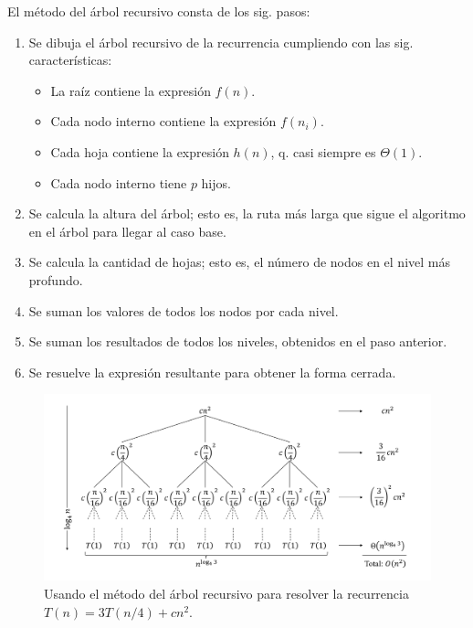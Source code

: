 El método del árbol recursivo consta de los sig. pasos:


\begin{enumerate}
  \item Se dibuja el árbol recursivo de la recurrencia cumpliendo con las sig. características:
  \begin{itemize}
    \item La raíz contiene la expresión \(f(n)\).
    \item Cada nodo interno contiene la expresión \(f(n_i)\).
    \item Cada hoja contiene la expresión \(h(n)\), q. casi siempre es \(\Theta(1)\).
    \item Cada nodo interno tiene \(p\) hijos.
  \end{itemize}
  \item Se calcula la altura del árbol; esto es, la ruta más larga que sigue el algoritmo en el árbol para llegar al caso base.
  \item Se calcula la cantidad de hojas; esto es, el número de nodos en el nivel más profundo.
  \item Se suman los valores de todos los nodos por cada nivel.
  \item Se suman los resultados de todos los niveles, obtenidos en el paso anterior.
  \item Se resuelve la expresión resultante para obtener la forma cerrada.
\end{enumerate}

\begin{figure}[t]
  \includegraphics[width=1\textwidth]{figuras/recursion-tree.png}
  \caption{Usando el método del árbol recursivo para resolver la recurrencia \(T(n)=3T(n/4)+cn^{2}\).}
  \label{fig:recursion_tree}
\end{figure}

